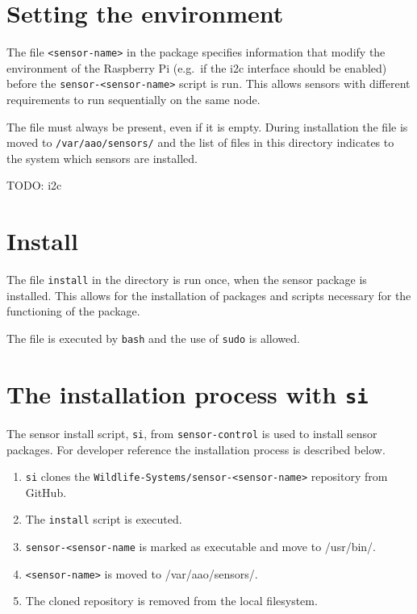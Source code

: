 \documentclass[
]{book}
\begin{document}
\section{Setting the environment}\label{setting-the-environment}

The file \texttt{\textless{}sensor-name\textgreater{}} in the package specifies information that modify the environment of the Raspberry Pi (e.g.~if the i2c interface should be enabled) before the \texttt{sensor-\textless{}sensor-name\textgreater{}} script is run. This allows sensors with different requirements to run sequentially on the same node.

The file must always be present, even if it is empty. During installation the file is moved to \texttt{/var/aao/sensors/} and the list of files in this directory indicates to the system which sensors are installed.

TODO: i2c

\section{Install}\label{install}

The file \texttt{install} in the directory is run once, when the sensor package is installed. This allows for the installation of packages and scripts necessary for the functioning of the package.

The file is executed by \texttt{bash} and the use of \texttt{sudo} is allowed.

\section{\texorpdfstring{The installation process with \texttt{si}}{The installation process with si}}\label{the-installation-process-with-si}

The sensor install script, \texttt{si}, from \texttt{sensor-control} is used to install sensor packages. For developer reference the installation process is described below.

\begin{enumerate}
\def\labelenumi{\arabic{enumi}.}
\item
  \texttt{si} clones the \texttt{Wildlife-Systems/sensor-\textless{}sensor-name\textgreater{}} repository from GitHub.
\item
  The \texttt{install} script is executed.
\item
  \texttt{sensor-\textless{}sensor-name} is marked as executable and move to /usr/bin/.
\item
  \texttt{\textless{}sensor-name\textgreater{}} is moved to /var/aao/sensors/.
\item
  The cloned repository is removed from the local filesystem.
\end{enumerate}
\end{document}
